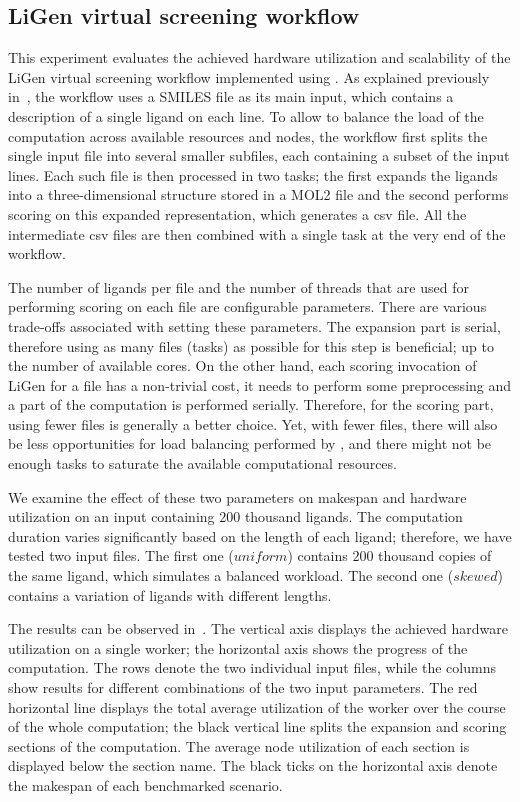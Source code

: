 \subsection{LiGen virtual screening workflow}
\label{sec:hq-exp-ligen}
This experiment evaluates the achieved hardware utilization and scalability of the LiGen virtual
screening workflow implemented using \hyperqueue{}. As explained previously
in~, the workflow uses a SMILES file as its main input, which contains a
description of a single ligand on each line. To allow \hyperqueue{} to balance the load
of the computation across available resources and nodes, the workflow first splits the single input
file into several smaller subfiles, each containing a subset of the input lines. Each such file is
then processed in two tasks; the first expands the ligands into a three-dimensional structure
stored in a MOL2 file and the second performs scoring on this expanded representation, which
generates a \gls{csv} file. All the intermediate \gls{csv} files are
then combined with a single task at the very end of the workflow.

The number of ligands per file and the number of threads that are used for performing scoring on
each file are configurable parameters. There are various trade-offs associated with setting these
parameters. The expansion part is serial, therefore using as many files (tasks) as possible for
this step is beneficial; up to the number of available cores. On the other hand, each scoring
invocation of LiGen for a file has a non-trivial cost, it needs to perform some preprocessing and a
part of the computation is performed serially. Therefore, for the scoring part, using fewer files
is generally a better choice. Yet, with fewer files, there will also be less opportunities for load
balancing performed by \hq{}, and there might not be enough tasks to saturate the
available computational resources.

We examine the effect of these two parameters on makespan and hardware utilization on an input
containing $200$ thousand ligands. The computation duration varies significantly
based on the length of each ligand; therefore, we have tested two input files. The first one
($uniform$) contains $200$ thousand copies of the same ligand,
which simulates a balanced workload. The second one ($skewed$) contains a variation
of ligands with different lengths.

The results can be observed in~. The vertical axis displays the achieved
hardware utilization on a single worker; the horizontal axis shows the progress of the computation.
The rows denote the two individual input files, while the columns show results for different
combinations of the two input parameters. The red horizontal line displays the total average
utilization of the worker over the course of the whole computation; the black vertical line splits
the expansion and scoring sections of the computation. The average node utilization of each section
is displayed below the section name. The black ticks on the horizontal axis denote the makespan of
each benchmarked scenario.

